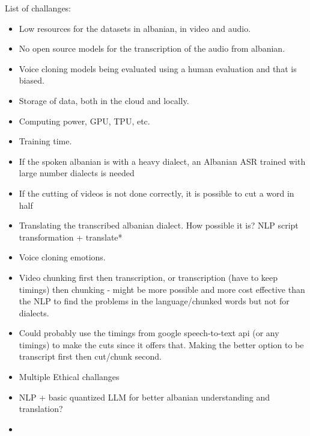 \documentclass[12pt]{article}
\begin{document}
List of challanges:
\begin{itemize}
    \item Low resources for the datasets in albanian, in video and audio.
    \item No open source models for the transcription of the audio from albanian.
    \item Voice cloning models being evaluated using a human evaluation and that is biased.
    \item Storage of data, both in the cloud and locally.
    \item Computing power, GPU, TPU, etc.
    \item Training time.
    \item If the spoken albanian is with a heavy dialect, an Albanian ASR trained with large number dialects is needed
    \item If the cutting of videos is not done correctly, it is possible to cut a word in half
    \item Translating the transcribed albanian dialect. How possible it is? NLP script transformation + translate*
    \item Voice cloning emotions.
    \item Video chunking first then transcription, or transcription (have to keep timings) then chunking - might be more possible and more cost effective than the NLP to find the problems in the language/chunked words but not for dialects.
    \item Could probably use the timings from google speech-to-text api (or any timings) to make the cuts since it offers that. Making the better option to be transcript first then cut/chunk second.  
    \item Multiple Ethical challanges
    \item NLP + basic quantized LLM for better albanian understanding and translation?
    \item 
\end{itemize}
\end{document}
